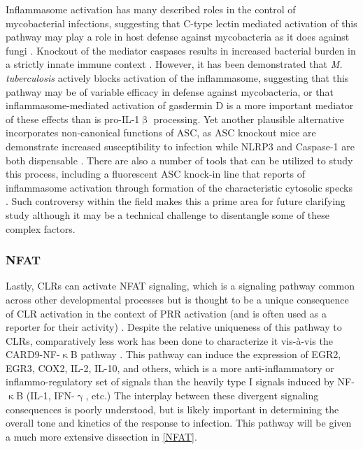 Inflammasome activation has many described roles in the control of mycobacterial infections, suggesting that C\hyp{}type lectin mediated activation of this pathway may play a role in host defense against mycobacteria as it does against fungi \citep{Hardison2012}. Knockout of the mediator caspases results in increased bacterial burden in a strictly innate immune context \citep{Kenyon2017}. However, it has been demonstrated that \textit{M. tuberculosis} actively blocks activation of the inflammasome, suggesting that this pathway may be of variable efficacy in defense against mycobacteria, or that inflammasome\hyp{}mediated activation of gasdermin D is a more important mediator of these effects than is pro\hyp{}IL\hyp{}1$\upbeta$ processing. Yet another plausible alternative incorporates non\hyp{}canonical functions of ASC, as ASC knockout mice are demonstrate increased susceptibility to infection while NLRP3 and Caspase\hyp{}1 are both dispensable \citep{McElvaniaTekippe2010}. There are also a number of tools that can be utilized to study this process, including a fluorescent ASC knock\hyp{}in line that reports of inflammasome activation through formation of the characteristic cytosolic specks \citep{Kuri2017}. Such controversy within the field makes this a prime area for future clarifying study although it may be a technical challenge to disentangle some of these complex factors.

\subsubsection{NFAT}\label{clr:nfat}

Lastly, CLRs can activate NFAT signaling, which is a signaling pathway common across other developmental processes but is thought to be a unique consequence of CLR activation in the context of PRR activation (and is often used as a reporter for their activity) \citep{Wilkins2004, Chow1999, Jauliac2002, Aramburu1998, HannantaAnan2016, Hooijberg2000, Goodridge2007, Goodridge2008, Bendickova2020, Fuller2007, Zhao2014}. Despite the relative uniqueness of this pathway to CLRs, comparatively less work has been done to characterize it vis\hyp{}\`{a}\hyp{}vis the CARD9\hyp{}NF\hyp{}$\upkappa$B pathway \citep{Goodridge2007, Goodridge2009, Deerhake2021}. This pathway can induce the expression of EGR2, EGR3, COX2, IL\hyp{}2, IL\hyp{}10, and others, which is a more anti\hyp{}inflammatory or inflammo\hyp{}regulatory set of signals than the heavily type I signals induced by NF\hyp{}$\upkappa$B (IL\hyp{}1, IFN\hyp{}$\upgamma$, etc.) The interplay between these divergent signaling consequences is poorly understood, but is likely important in determining the overall tone and kinetics of the response to infection. This pathway will be given a much more extensive dissection in \autoref{NFAT}.

